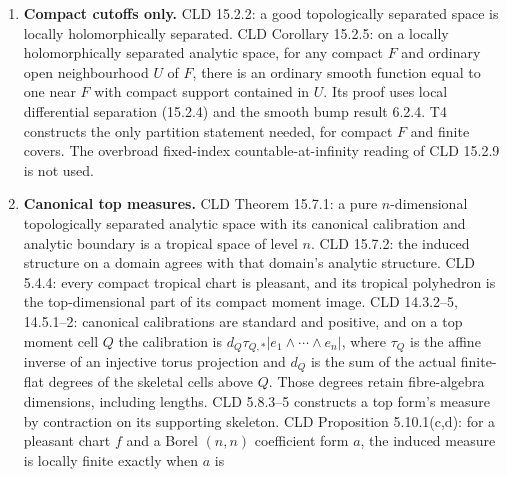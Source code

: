 \documentclass[
  10pt,
]{article}
\begin{document}
\begin{enumerate}
  Euclidean neighbourhood of the coordinate value. CLD Proposition
  15.1.1(b) gives ordinary open moment descriptions for forms in every
  bidegree. CLD 6.2.1--2 defines ordinary forms and says they form an
  ordinary sheaf stable under wedge, \(J,d',d''\). Moment pullback
  commutes with the exterior calculus (CLD 3.3.12). In a moment a
  logarithm is an affine coordinate, so \(Dt_f=0\) as a \textbf{form}.
  CLD 3.4.4: for a G-tropical chart \(f\) and a coefficient form \(a\),
  its pullback is zero in the G-form sheaf exactly when \(a\) restricts
  to zero on \(f(V)\) for every compact domain \(V\). This identifies
  the ordinary form sheaves when the analytic units, domains and moment
  images are the same; it is not descent through scalar projection.
\item
  \textbf{Compact cutoffs only.} CLD 15.2.2: a good topologically
  separated space is locally holomorphically separated. CLD Corollary
  15.2.5: on a locally holomorphically separated analytic space, for any
  compact \(F\) and ordinary open neighbourhood \(U\) of \(F\), there is
  an ordinary smooth function equal to one near \(F\) with compact
  support contained in \(U\). Its proof uses local differential
  separation (15.2.4) and the smooth bump result 6.2.4. T4 constructs
  the only partition statement needed, for compact \(F\) and finite
  covers. The overbroad fixed-index countable-at-infinity reading of CLD
  15.2.9 is not used.
\item
  \textbf{Canonical top measures.} CLD Theorem 15.7.1: a pure
  \(n\)-dimensional topologically separated analytic space with its
  canonical calibration and analytic boundary is a tropical space of
  level \(n\). CLD 15.7.2: the induced structure on a domain agrees with
  that domain's analytic structure. CLD 5.4.4: every compact tropical
  chart is pleasant, and its tropical polyhedron is the top-dimensional
  part of its compact moment image. CLD 14.3.2--5, 14.5.1--2: canonical
  calibrations are standard and positive, and on a top moment cell \(Q\)
  the calibration is \(d_Q\tau_{Q,*}|e_1\wedge\cdots\wedge e_n|\), where
  \(\tau_Q\) is the affine inverse of an injective torus projection and
  \(d_Q\) is the sum of the actual finite-flat degrees of the skeletal
  cells above \(Q\). Those degrees retain fibre-algebra dimensions,
  including lengths. CLD 5.8.3--5 constructs a top form's measure by
  contraction on its supporting skeleton. CLD Proposition 5.10.1(c,d):
  for a pleasant chart \(f\) and a Borel \((n,n)\) coefficient form
  \(a\), the induced measure is locally finite exactly when \(a\) is

\end{enumerate}
\end{document}
